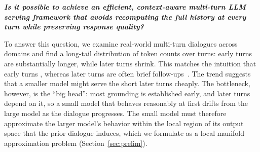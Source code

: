 \textit{\textbf{Is it possible to achieve an efficient, context-aware multi-turn LLM serving framework that avoids recomputing the full history at every turn while preserving response quality?}}


To answer this question, we examine real-world multi-turn dialogues across domains and find a long-tail distribution of token counts over turns: early turns are substantially longer, while later turns shrink. This matches the intuition that early turns , whereas later turns are often brief follow-ups~\citep{he2018decoupling, stolcke2000dialogue}. The trend suggests that a smaller model might serve the short later turns cheaply. The bottleneck, however, is the “big head”: most grounding is established early, and later turns depend on it, so a small model that behaves reasonably at first drifts from the large model as the dialogue progresses. The small model must therefore approximate the larger model's behavior within the local region of its output space that the prior dialogue induces, which we formulate as a local manifold approximation problem (Section~\ref{sec:prelim}).

